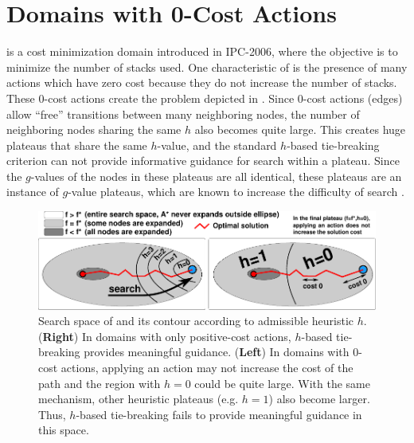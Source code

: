\section{Domains with 0-Cost Actions}
\label{sec:zerocost-domains}
  is a cost
minimization domain introduced in IPC-2006, where the objective is to 
minimize the number of stacks used.
One characteristic of  is the presence of many  actions which have zero cost because they do not increase the number of stacks. These 0-cost actions create the problem depicted in .
Since 0-cost actions (edges) allow ``free'' transitions between many neighboring nodes,
the number of neighboring nodes sharing the same $h$ also becomes quite large.
This creates huge plateaus that share the same $h$-value, and the standard $h$-based tie-breaking criterion can not provide informative guidance for search within a plateau.
Since the $g$-values of the nodes in these plateaus are all identical, these plateaus are an instance of $g$-value plateaus, which are known to increase the difficulty of search \cite{benton2010g}. %

\begin{figure}[tbp]
  \centering
  \includegraphics[width=\textwidth]{img/astar/plateau-1.pdf}
 \caption{Search space of \astar and its contour according to admissible heuristic $h$. (\textbf{Right}) In domains with only positive-cost actions, $h$-based tie-breaking provides meaningful guidance. (\textbf{Left}) In domains with 0-cost actions, applying an action may not increase the cost of the path and the region with $h=0$ could be quite large. With the same mechanism, other heuristic plateaus (e.g. $h=1$) also become larger. Thus, $h$-based tie-breaking fails to provide meaningful guidance in this space.
  }
 \label{fig:plateau-1}
\end{figure}


